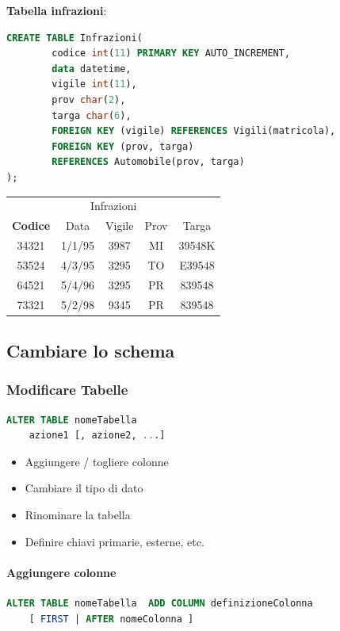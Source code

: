 \documentclass[12pt,a4paper]{article}
\begin{document}
\flushleft
\textbf{Tabella infrazioni}:
\begin{lstlisting}[language = SQL]
CREATE TABLE Infrazioni(
        codice int(11) PRIMARY KEY AUTO_INCREMENT,
        data datetime,
        vigile int(11),
        prov char(2),
        targa char(6),
        FOREIGN KEY (vigile) REFERENCES Vigili(matricola),
        FOREIGN KEY (prov, targa) 
        REFERENCES Automobile(prov, targa)
);
\end{lstlisting}
\begin{center}
\begin{tabular}{ccccc}
\multicolumn{5}{c}{Infrazioni} \\
\textbf{Codice} & Data & Vigile & Prov & Targa \\ \hline
34321 & 1/1/95 & 3987 & MI & 39548K\\
53524 & 4/3/95 & 3295 & TO & E39548\\
64521 & 5/4/96 & 3295 & PR & 839548\\ 
73321 & 5/2/98 & 9345 & PR & 839548\\  \hline
\end{tabular}
\end{center}

\subsection{Cambiare lo schema}
\subsubsection{Modificare Tabelle}
\begin{lstlisting}[language = SQL]
ALTER TABLE nomeTabella
    azione1 [, azione2, ...]
\end{lstlisting}
\begin{itemize}
\item Aggiungere / togliere colonne
\item Cambiare il tipo di dato
\item Rinominare la tabella
\item Definire chiavi primarie, esterne, etc.
\end{itemize}

\paragraph{Aggiungere colonne\\}
\flushleft
\begin{lstlisting}[language = SQL]
ALTER TABLE nomeTabella  ADD COLUMN definizioneColonna
	[ FIRST | AFTER nomeColonna ]
\end{lstlisting}
\end{document}
